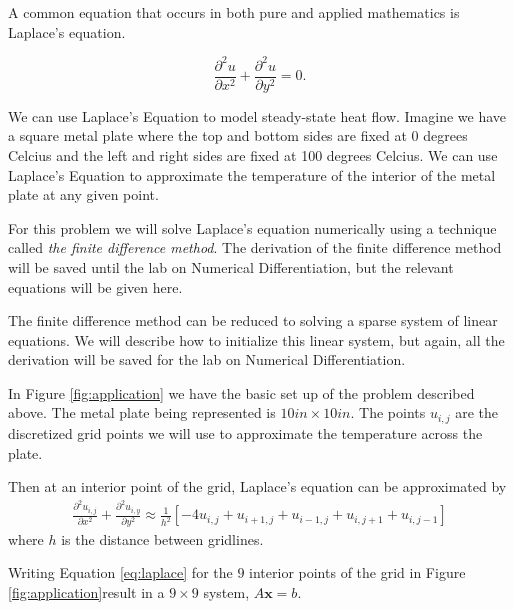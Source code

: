 \begin{problem} \label{prob:application}

A common equation that occurs in both pure and applied mathematics is Laplace's equation.

\[ \frac{\partial^2 u}{\partial x^2}+ \frac{\partial^2 u}{\partial y^2}= 0.\]

We can use Laplace's Equation to model steady-state heat flow. Imagine we have a square metal plate where the top and bottom sides are fixed at 0 degrees Celcius and the left and right sides are fixed at 100 degrees Celcius. We can use Laplace's Equation to approximate the temperature of the interior of the metal plate at any given point.

For this problem we will solve Laplace's equation numerically using a technique called \textit{the finite difference method}.  The derivation of the finite difference method will be saved until the lab on Numerical Differentiation, but the relevant equations will be given here.

The finite difference method can be reduced to solving a sparse system of linear equations. We will describe how to initialize this linear system, but again, all the derivation will be saved for the lab on Numerical Differentiation.

In Figure \ref{fig:application} we have the basic set up of the problem described above. The metal plate being represented is $10 in \times 10 in$. The points $u_{i,j}$ are the discretized grid points we will use to approximate the temperature across the plate.

Then at an interior point of the grid, Laplace's equation can be approximated by
\begin{equation} \label{eq:laplace}
\begin{split}
    \frac{\partial^2 u_{i,j}}{\partial x^2}+ \frac{\partial^2 u_{i,y}}{\partial y^2} \approx \frac{1}{h^2}\left[-4u_{i,j} + u_{i+1,j} + u_{i-1,j} + u_{i,j+1} +  u_{i,j-1}\right]
\end{split}
\end{equation}
where $h$ is the distance between gridlines.

Writing Equation \ref{eq:laplace} for the $9$ interior points of the grid in Figure \ref{fig:application}result in a $9 \times 9$ system, $A \mathbf{x} = b$.


\end{problem}
